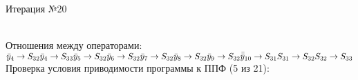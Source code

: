 \documentclass[a4paper,14pt]{article}
\begin{document}
\newpage \\ 
\begin{center}\huge Итерация №20 \end{center}\\
Отношения между операторами: \\ \newline
\begin{math}
    \bar{y}_{4} \rightarrow S_{32} \\ 
\bar{y}_{4} \rightarrow S_{33} \\ 
\bar{y}_{5} \rightarrow S_{32} \\ 
\bar{y}_{6} \rightarrow S_{32} \\ 
\bar{y}_{7} \rightarrow S_{32} \\ 
\bar{y}_{8} \rightarrow S_{32} \\ 
\bar{y}_{9} \rightarrow S_{32} \\ 
\bar{\bar{y}}_{10} \rightarrow S_{31} \\ 
S_{31} \rightarrow S_{32} \\ 
S_{32} \rightarrow S_{33}
\end{math}\\ \newline
%
Проверка условия приводимости программы к ППФ (5 из 21): \\
\end{document}
